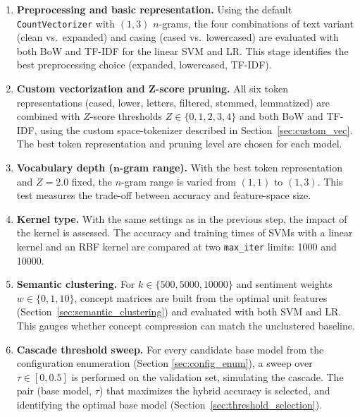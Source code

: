 \documentclass[a4paper,fleqn]{cas-dc}
\newcommand{\zscore}{Z}
\newcommand{\logreg}{LR}
\newcommand{\code}[1]{\texttt{#1}}
\newcommand{\kconcepts}{k}
\newcommand{\weightparam}{w}
\newcommand{\thresh}{\tau}
\begin{document}
\begin{enumerate}
	\item \textbf{Preprocessing and basic representation.} Using the default \texttt{CountVectorizer} with $(1,3)$ $n$-grams, the four combinations of text variant (clean vs.\ expanded) and casing (cased vs.\ lowercased) are evaluated with both BoW and TF-IDF for the linear SVM and \logreg{}. This stage identifies the best preprocessing choice (expanded, lowercased, TF-IDF).
	
	\item \textbf{Custom vectorization and $\mathbf{\zscore}$-score pruning.} All six token representations (cased, lower, letters, filtered, stemmed, lemmatized) are combined with $\zscore$-score thresholds $\zscore \in \{0,1,2,3,4\}$ and both BoW and TF-IDF, using the custom space-tokenizer described in Section~\ref{sec:custom_vec}. The best token representation and pruning level are chosen for each model.
	
	\item \textbf{Vocabulary depth ($\boldsymbol{n}$-gram range).} With the best token representation and $\zscore=2.0$ fixed, the $n$-gram range is varied from $(1,1)$ to $(1,3)$. This test measures the trade-off between accuracy and feature-space size.
	
	\item \textbf{Kernel type.} With the same settings as in the previous step, the impact of the kernel is assessed. The accuracy and training times of SVMs with a linear kernel and an RBF kernel are compared at two \code{max\_iter} limits: \num{1000} and \num{10000}.
	
	\item \textbf{Semantic clustering.} For $\kconcepts \in \{\num{500}, \num{5000}, \num{10000}\}$ and sentiment weights $\weightparam \in \{0, 1, 10\}$, concept matrices are built from the optimal unit features (Section~\ref{sec:semantic_clustering}) and evaluated with both SVM and \logreg. This gauges whether concept compression can match the unclustered baseline.
	
	\item \textbf{Cascade threshold sweep.} For every candidate base model from the configuration enumeration (Section \ref{sec:config_enum}), a sweep over $\thresh \in [0,0.5]$ is performed on the validation set, simulating the cascade. The pair (base model, $\thresh$) that maximizes the hybrid accuracy is selected, and identifying the optimal base model (Section~\ref{sec:threshold_selection}).
\end{enumerate}
\end{document}

